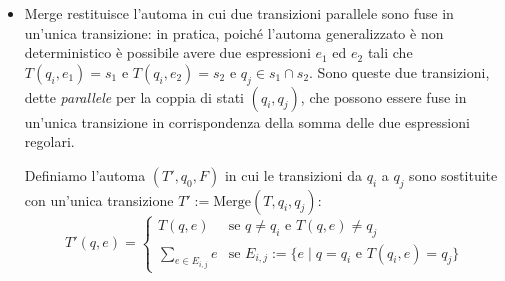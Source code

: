 \begin{itemize}
\begin{figure}[H]
\caption{Trasformazione dell'automa $\mathcal{A}$ dopo Setup.}
\label{fig:setup}
\end{figure}

    \item Merge restituisce l'automa in cui due transizioni parallele sono fuse in un'unica transizione: in pratica, poiché l'automa generalizzato è non deterministico è possibile avere due espressioni $e_1$ ed $e_2$ tali che $T(q_i, e_1) = s_1$ e $T(q_i, e_2) = s_2$ e $q_j \in s_1 \cap s_2$. Sono queste due transizioni, dette \textit{parallele} per la coppia di stati $(q_i, q_j)$, che possono essere fuse in un'unica transizione in corrispondenza della somma delle due espressioni regolari.
    
    Definiamo l'automa $(T', q_0, F)$ in cui le transizioni da $q_i$ a $q_j$ sono sostituite con un'unica transizione $T' := \text{Merge}(T, q_i, q_j)$:
    \[
    T'(q, e) = 
    \begin{cases} 
    T(q, e) & \text{se } q \neq q_i \text{ e } T(q, e) \neq q_j \\ 
    \displaystyle \sum_{e \in E_{i,j}} e & \text{se } E_{i,j} := \{e \mid q = q_i \text{ e } T(q_i, e) = q_j\} 
    \end{cases}
    \]

\begin{figure}[H]
\centering
{}
\end{figure}
\end{itemize}

